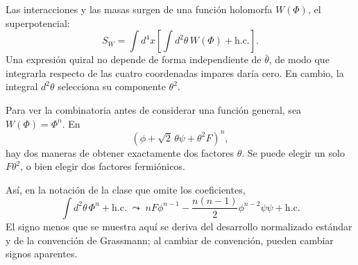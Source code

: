 Las interacciones y las masas surgen de una función holomorfa \(W(\Phi)\), el superpotencial:
\begin{equation}
S_W
=
\int d^4x
\left[
\int d^2\theta\,W(\Phi)
+\mathrm{h.c.}
\right].
\label{eq:l9-superpotential-action}
\end{equation}
Una expresión quiral no depende de forma independiente de \(\bar\theta\), de modo que integrarla respecto de las cuatro coordenadas impares daría cero. En cambio, la integral \(d^2\theta\) selecciona su componente \(\theta^2\).

Para ver la combinatoria antes de considerar una función general, sea \(W(\Phi)=\Phi^n\). En
\begin{equation}
(\phi+\sqrt2\,\theta\psi+\theta^2F)^n,
\end{equation}
hay dos maneras de obtener exactamente dos factores \(\theta\). Se puede elegir un solo \(F\theta^2\), o bien elegir dos factores fermiónicos.

\begin{classroomqa}
\end{classroomqa}

\begin{classroomqa}
\end{classroomqa}

Así, en la notación de la clase que omite los coeficientes,
\begin{equation}
\int d^2\theta\,\Phi^n+\mathrm{h.c.}
\;\leadsto\;
nF\phi^{n-1}
-\frac{n(n-1)}{2}\phi^{n-2}\psi\psi
+\mathrm{h.c.}
\label{eq:l9-power-extraction}
\end{equation}
El signo menos que se muestra aquí se deriva del desarrollo normalizado estándar y de la convención de Grassmann; al cambiar de convención, pueden cambiar signos aparentes.

\begin{classroomqa}
\end{classroomqa}

